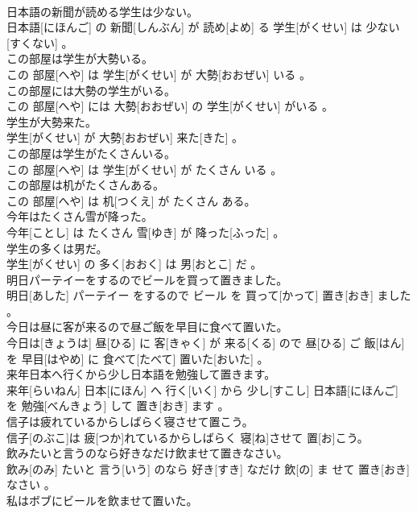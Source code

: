 \documentclass[8pt]{extreport}
\begin{document}
\begin{CJK}{UTF8}{min}
\\	日本語の新聞が読める学生は少ない。	
\\	日本語[にほんご] の 新聞[しんぶん] が 読め[よめ] る 学生[がくせい] は 少ない[すくない] 。
\\	この部屋は学生が大勢いる。	
\\	この 部屋[へや] は 学生[がくせい] が 大勢[おおぜい] いる 。
\\	この部屋には大勢の学生がいる。	
\\	この 部屋[へや] には 大勢[おおぜい] の 学生[がくせい] がいる 。
\\	学生が大勢来た。	
\\	学生[がくせい] が 大勢[おおぜい] 来た[きた] 。
\\	この部屋は学生がたくさんいる。	
\\	この 部屋[へや] は 学生[がくせい] が たくさん いる 。
\\	この部屋は机がたくさんある。	
\\	この 部屋[へや] は 机[つくえ] が たくさん ある。
\\	今年はたくさん雪が降った。	
\\	今年[ことし] は たくさん 雪[ゆき] が 降った[ふった] 。
\\	学生の多くは男だ。	
\\	学生[がくせい] の 多く[おおく] は 男[おとこ] だ 。
\\	明日パーテイーをするのでビールを買って置きました。	
\\	明日[あした] パーテイー をするので ビール を 買って[かって] 置き[おき] ました 。
\\	今日は昼に客が来るので昼ご飯を早目に食べて置いた。	
\\	今日は[きょうは] 昼[ひる] に 客[きゃく] が 来る[くる] ので 昼[ひる] ご 飯[はん] を 早目[はやめ] に 食べて[たべて] 置いた[おいた] 。
\\	来年日本へ行くから少し日本語を勉強して置きます。	
\\	来年[らいねん] 日本[にほん] へ 行く[いく] から 少し[すこし] 日本語[にほんご] を 勉強[べんきょう] して 置き[おき] ます 。
\\	信子は疲れているからしばらく寝させて置こう。	
\\	信子[のぶこ]は 疲[つか]れているからしばらく 寝[ね]させて 置[お]こう。
\\	飲みたいと言うのなら好きなだけ飲ませて置きなさい。	
\\	飲み[のみ] たいと 言う[いう] のなら 好き[すき] なだけ 飲[の] ま せて 置き[おき] なさい 。
\\	私はボブにビールを飲ませて置いた。	

\end{CJK}
\end{document}
